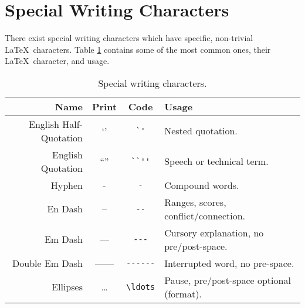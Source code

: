 \section{Special Writing Characters}
%
There exist special writing characters which have specific,
non-trivial \LaTeX~characters.  Table \ref{t:swc} contains some of the
most common ones, their \LaTeX~character, and usage.
\begin{table}[!htbp]
  \centering
  \caption{Special writing characters.}
  \label{t:swc}
  \begin{tabular}{rccl}
    \toprule
    Name & Print & Code & Usage \\
    \midrule
    English Half-Quotation & `' & \verb|`'| & Nested quotation. \\
    English Quotation & ``'' & \verb|``''| & Speech or technical term. \\
    Hyphen & - & \verb|-| & Compound words. \\
    En Dash & -- & \verb|--| & Ranges, scores, conflict/connection. \\
    Em Dash & --- & \verb|---| & Cursory explanation, no pre/post-space. \\
    Double Em Dash & ------ & \verb|------| & Interrupted word, no pre-space. \\
    Ellipses & \ldots & \verb|\ldots| & Pause, pre/post-space optional (format). \\
    \bottomrule
  \end{tabular}
\end{table}
%
